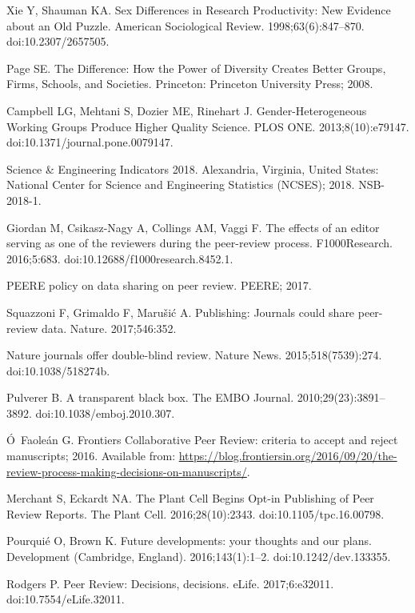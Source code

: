 \documentclass[10pt,letterpaper]{article}
\begin{document}
\begin{thebibliography}{100}
Xie Y, Shauman KA.
\newblock Sex {Differences} in {Research} {Productivity}: {New} {Evidence}
  about an {Old} {Puzzle}.
\newblock American Sociological Review. 1998;63(6):847--870.
\newblock doi:{10.2307/2657505}.

Page SE.
\newblock The {Difference}: {How} the {Power} of {Diversity} {Creates} {Better}
  {Groups}, {Firms}, {Schools}, and {Societies}.
\newblock Princeton: Princeton University Press; 2008.

Campbell LG, Mehtani S, Dozier ME, Rinehart J.
\newblock Gender-{Heterogeneous} {Working} {Groups} {Produce} {Higher}
  {Quality} {Science}.
\newblock PLOS ONE. 2013;8(10):e79147.
\newblock doi:{10.1371/journal.pone.0079147}.

Science \& {Engineering} {Indicators} 2018.
\newblock Alexandria, Virginia, United States: National Center for Science and
  Engineering Statistics (NCSES); 2018. NSB-2018-1.

Giordan M, Csikasz-Nagy A, Collings AM, Vaggi F.
\newblock The effects of an editor serving as one of the reviewers during the
  peer-review process.
\newblock F1000Research. 2016;5:683.
\newblock doi:{10.12688/f1000research.8452.1}.

{PEERE} policy on data sharing on peer review.
\newblock PEERE; 2017.

Squazzoni F, Grimaldo F, Maru{\v s}i{\'c} A.
\newblock Publishing: {Journals} could share peer-review data.
\newblock Nature. 2017;546:352.

Nature journals offer double-blind review.
\newblock Nature News. 2015;518(7539):274.
\newblock doi:{10.1038/518274b}.

Pulverer B.
\newblock A transparent black box.
\newblock The EMBO Journal. 2010;29(23):3891--3892.
\newblock doi:{10.1038/emboj.2010.307}.

{\'O}~Faole{\'a}n G. Frontiers {Collaborative} {Peer} {Review}: criteria to
  accept and reject manuscripts; 2016.
\newblock Available from:
  \url{https://blog.frontiersin.org/2016/09/20/the-review-process-making-decisions-on-manuscripts/}.

Merchant S, Eckardt NA.
\newblock The {Plant} {Cell} {Begins} {Opt}-in {Publishing} of {Peer} {Review}
  {Reports}.
\newblock The Plant Cell. 2016;28(10):2343.
\newblock doi:{10.1105/tpc.16.00798}.

Pourqui{\'e} O, Brown K.
\newblock Future developments: your thoughts and our plans.
\newblock Development (Cambridge, England). 2016;143(1):1--2.
\newblock doi:{10.1242/dev.133355}.

Rodgers P.
\newblock Peer {Review}: {Decisions}, decisions.
\newblock eLife. 2017;6:e32011.
\newblock doi:{10.7554/eLife.32011}.


\end{thebibliography}
\end{document}
